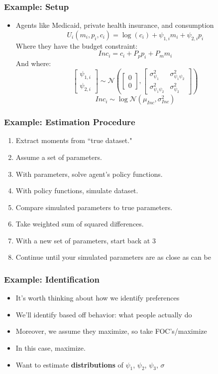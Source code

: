 \documentclass{beamer}
\begin{document}
\begin{frame}
\frametitle{Example: Setup}
\begin{itemize}
\item Agents like Medicaid, private health insurance, and consumption
$$U_i(m_i,p_i,c_i)=\log(c_i)+\psi_{1,i}m_i+\psi_{2,i}p_i$$
Where they have the budget constraint:
$$Inc_i=c_i+P_pp_i+P_mm_i$$
And where:
$$\left[\begin{array}{c}\psi_{1,i}\\\psi_{2,i}\end{array}\right]\sim\mathcal{N}\left(\left[\begin{array}{c}0\\0\end{array}\right],\left[\begin{array}{cc}\sigma_{\psi_1}^2 & \sigma_{\psi_1\psi_2}^2 \\ \sigma_{\psi_1\psi_2}^2 & \sigma_{\psi_2}^2 \end{array}\right]\right)$$
$$Inc_i\sim\log\mathcal{N}(\mu_{Inc},\sigma^2_{Inc})$$
\end{itemize}
\end{frame}


\begin{frame}
\frametitle{Example: Estimation Procedure}
\begin{enumerate}
\item Extract moments from ``true dataset."
\item Assume a set of parameters.  
\item With parameters, solve agent's policy functions.
\item With policy functions, simulate dataset.  
\item Compare simulated parameters to true parameters.  
\item Take weighted sum of squared differences.
\item With a new set of parameters, start back at 3
\item Continue until your simulated parameters are as close as can be
\end{enumerate}
\end{frame}


\begin{frame}
\frametitle{Example: Identification}
\begin{itemize}
\item It's worth thinking about how we identify preferences
\bigskip
\item We'll identify based off behavior: what people actually do
\bigskip
\item Moreover, we assume they maximize, so take FOC's/maximize
\bigskip
\item In this case, maximize.
\bigskip
\item Want to estimate \textbf{distributions} of $\psi_1$, $\psi_2$, $\psi_3$, $\sigma$
\end{itemize}
\end{frame}
\end{document}
